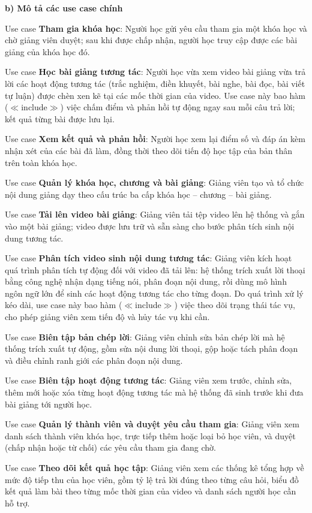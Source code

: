 \documentclass[../DoAn.tex]{subfiles}
\begin{document}
\textbf{b) Mô tả các use case chính}

Use case \textbf{Tham gia khóa học}: Người học gửi yêu cầu tham gia một khóa học và chờ giảng viên duyệt; sau khi được chấp nhận, người học truy cập được các bài giảng của khóa học đó.

Use case \textbf{Học bài giảng tương tác}: Người học vừa xem video bài giảng vừa trả lời các hoạt động tương tác (trắc nghiệm, điền khuyết, bài nghe, bài đọc, bài viết tự luận) được chèn xen kẽ tại các mốc thời gian của video. Use case này bao hàm (\(\ll\)include\(\gg\)) việc chấm điểm và phản hồi tự động ngay sau mỗi câu trả lời; kết quả từng bài được lưu lại.

Use case \textbf{Xem kết quả và phản hồi}: Người học xem lại điểm số và đáp án kèm nhận xét của các bài đã làm, đồng thời theo dõi tiến độ học tập của bản thân trên toàn khóa học.

Use case \textbf{Quản lý khóa học, chương và bài giảng}: Giảng viên tạo và tổ chức nội dung giảng dạy theo cấu trúc ba cấp khóa học -- chương -- bài giảng.

Use case \textbf{Tải lên video bài giảng}: Giảng viên tải tệp video lên hệ thống và gắn vào một bài giảng; video được lưu trữ và sẵn sàng cho bước phân tích sinh nội dung tương tác.

Use case \textbf{Phân tích video sinh nội dung tương tác}: Giảng viên kích hoạt quá trình phân tích tự động đối với video đã tải lên: hệ thống trích xuất lời thoại bằng công nghệ nhận dạng tiếng nói, phân đoạn nội dung, rồi dùng mô hình ngôn ngữ lớn để sinh các hoạt động tương tác cho từng đoạn. Do quá trình xử lý kéo dài, use case này bao hàm (\(\ll\)include\(\gg\)) việc theo dõi trạng thái tác vụ, cho phép giảng viên xem tiến độ và hủy tác vụ khi cần.

Use case \textbf{Biên tập bản chép lời}: Giảng viên chỉnh sửa bản chép lời mà hệ thống trích xuất tự động, gồm sửa nội dung lời thoại, gộp hoặc tách phân đoạn và điều chỉnh ranh giới các phân đoạn nội dung.

Use case \textbf{Biên tập hoạt động tương tác}: Giảng viên xem trước, chỉnh sửa, thêm mới hoặc xóa từng hoạt động tương tác mà hệ thống đã sinh trước khi đưa bài giảng tới người học.

Use case \textbf{Quản lý thành viên và duyệt yêu cầu tham gia}: Giảng viên xem danh sách thành viên khóa học, trực tiếp thêm hoặc loại bỏ học viên, và duyệt (chấp nhận hoặc từ chối) các yêu cầu tham gia đang chờ.

Use case \textbf{Theo dõi kết quả học tập}: Giảng viên xem các thống kê tổng hợp về mức độ tiếp thu của học viên, gồm tỷ lệ trả lời đúng theo từng câu hỏi, biểu đồ kết quả làm bài theo từng mốc thời gian của video và danh sách người học cần hỗ trợ.
\end{document}
